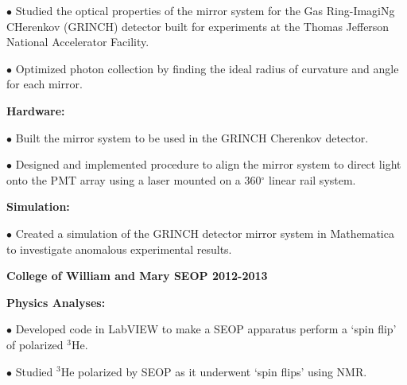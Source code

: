 \documentclass[letterpaper,10pt]{article}
\renewenvironment{itemize}{
  \begin{list}{}{
    \setlength{\leftmargin}{1.5em}
  }
}{
  \end{list}
}
\begin{document}
{\begin{itemize}
\begin{itemize}
    \begin{itemize}\itemsep5pt \parskip0pt 
     \item $\bullet$ Studied the optical properties of the mirror system for the Gas Ring-ImagiNg CHerenkov (GRINCH) detector built for experiments at the Thomas Jefferson National Accelerator Facility. 
     \item $\bullet$ Optimized photon collection by finding the ideal radius of curvature and angle for each mirror.
     \end{itemize}

  \item \textbf{Hardware:}
    \begin{itemize}\itemsep5pt \parskip0pt 
     \item $\bullet$ Built the mirror system to be used in the GRINCH Cherenkov detector.
     \item $\bullet$ Designed and implemented procedure to align the mirror system to direct light onto the PMT array using a laser mounted on a 360$^\circ$ linear rail system.
    \end{itemize}
    
   \item \textbf{Simulation:}
     \begin{itemize}\itemsep5pt \parskip0pt 
      \item $\bullet$ Created a simulation of the GRINCH detector mirror system in Mathematica to investigate anomalous experimental results.
     \end{itemize} 
 
\end{itemize}

\vspace{3mm}

\item {\large {\bf College of William and Mary SEOP 2012-2013} }
 \begin{itemize}\itemsep5pt \parskip0pt 
  \item \textbf{Physics Analyses:}
   
    \begin{itemize}\itemsep5pt
     \item $\bullet$ Developed code in LabVIEW to make a SEOP apparatus perform a `spin flip' of polarized $^{3}$He.
     \item $\bullet$ Studied $^{3}$He polarized by SEOP as it underwent `spin flips' using NMR.
     \end{itemize}


\end{itemize}
\end{itemize}}
\end{document}
